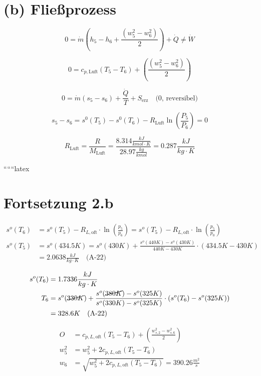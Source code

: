 \section*{(b) Fließprozess}

\[
0 = \dot{m} \left( h_5 - h_6 + \frac{(w_5^2 - w_6^2)}{2} \right) + \dot{Q} \neq \dot{W}
\]

\[
0 = c_{p,\text{Luft}} (T_5 - T_6) + \left( \frac{(w_5^2 - w_6^2)}{2} \right)
\]

\[
0 = \dot{m} (s_5 - s_6) + \frac{\dot{Q}}{T} + S_{\text{erz}} \quad \text{(0, reversibel)}
\]

\[
s_5 - s_6 = s^0 (T_5) - s^0 (T_6) - R_{\text{Luft}} \ln \left( \frac{P_5}{P_6} \right) = 0
\]

\[
R_{\text{Luft}} = \frac{R}{M_{\text{Luft}}} = \frac{8.314 \frac{kJ}{kmol \cdot K}}{28.97 \frac{kg}{kmol}} = 0.287 \frac{kJ}{kg \cdot K}
\]

``````latex

\section*{Fortsetzung 2.b}

\begin{align*}
    s^o(T_6) &= s^o(T_5) - R_{L, \text{oft}} \cdot \ln \left( \frac{p_5}{p_6} \right) = s^o(T_5) - R_{L, \text{oft}} \cdot \ln \left( \frac{p_5}{p_0} \right) \\
    s^o(T_5) &= s^o(434.5K) = s^o(430K) + \frac{s^o(440K) - s^o(430K)}{440K - 430K} \cdot (434.5K - 430K) \\
    &= 2.0638 \frac{kJ}{kg \cdot K} \quad \text{(A-22)}
\end{align*}

\begin{align*}
    s^o(T_6) &= 1.7336 \frac{kJ}{kg \cdot K} \\
    T_6 &= s^o(\cancel{330K}) + \frac{s^o(\cancel{380K}) - s^o(325K)}{s^o(330K) - s^o(325K)} \cdot (s^o(T_6) - s^o(325K)) \\
    &= 328.6K \quad \text{(A-22)}
\end{align*}

\begin{align*}
    O &= c_{p, L, \text{oft}} (T_5 - T_6) + \left( \frac{w_{s, 2}^2 - w_{s, 6}^2}{2} \right) \\
    w_5^2 &= w_5^2 + 2 c_{p, L, \text{oft}} (T_5 - T_6) \\
    w_6 &= \sqrt{w_5^2 + 2 c_{p, L, \text{oft}} (T_5 - T_6)} = 390.26 \frac{m^2}{s}
\end{align*}